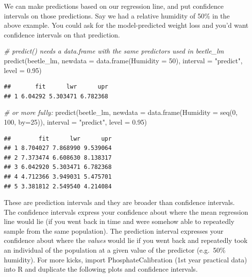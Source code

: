 \documentclass[
  11pt,
  a4paper,
]{book}
\newenvironment{Shaded}{\begin{snugshade}}{\end{snugshade}}
\newcommand{\AttributeTok}[1]{\textcolor[rgb]{0.77,0.63,0.00}{#1}}
\newcommand{\CommentTok}[1]{\textcolor[rgb]{0.56,0.35,0.01}{\textit{#1}}}
\newcommand{\DecValTok}[1]{\textcolor[rgb]{0.00,0.00,0.81}{#1}}
\newcommand{\FloatTok}[1]{\textcolor[rgb]{0.00,0.00,0.81}{#1}}
\newcommand{\FunctionTok}[1]{\textcolor[rgb]{0.00,0.00,0.00}{#1}}
\newcommand{\NormalTok}[1]{#1}
\newcommand{\StringTok}[1]{\textcolor[rgb]{0.31,0.60,0.02}{#1}}
\begin{document}
We can make predictions based on our regression line, and put confidence intervals on those predictions. Say we had a relative humidity of 50\% in the above example. You could ask for the model-predicted weight loss and you'd want confidence intervals on that prediction.

\begin{Shaded}
\begin{Highlighting}[]
\CommentTok{\# predict() needs a data.frame with the same predictors used in beetle\_lm}
\FunctionTok{predict}\NormalTok{(beetle\_lm, }
        \AttributeTok{newdata =} \FunctionTok{data.frame}\NormalTok{(}\AttributeTok{Humidity =} \DecValTok{50}\NormalTok{), }
        \AttributeTok{interval =} \StringTok{"predict"}\NormalTok{, }
        \AttributeTok{level =} \FloatTok{0.95}\NormalTok{)}
\end{Highlighting}
\end{Shaded}

\begin{verbatim}
##       fit      lwr      upr
## 1 6.04292 5.303471 6.782368
\end{verbatim}

\begin{Shaded}
\begin{Highlighting}[]
\CommentTok{\# or more fully:}
\FunctionTok{predict}\NormalTok{(beetle\_lm, }
        \AttributeTok{newdata =} \FunctionTok{data.frame}\NormalTok{(}\AttributeTok{Humidity =} \FunctionTok{seq}\NormalTok{(}\DecValTok{0}\NormalTok{, }\DecValTok{100}\NormalTok{, }\AttributeTok{by=}\DecValTok{25}\NormalTok{)), }
        \AttributeTok{interval =} \StringTok{"predict"}\NormalTok{, }
        \AttributeTok{level =} \FloatTok{0.95}\NormalTok{)}
\end{Highlighting}
\end{Shaded}

\begin{verbatim}
##        fit      lwr      upr
## 1 8.704027 7.868990 9.539064
## 2 7.373474 6.608630 8.138317
## 3 6.042920 5.303471 6.782368
## 4 4.712366 3.949031 5.475701
## 5 3.381812 2.549540 4.214084
\end{verbatim}

These are prediction intervals and they are broader than confidence intervals. The confidence intervals express your confidence about where the mean regression line would lie (if you went back in time and were somehow able to repeatedly sample from the same population). The prediction interval expresses your confidence about where the \emph{values} would lie if you went back and repeatedly took an individual of the population at a given value of the predictor (e.g.~50\% humidity).
For more kicks, import PhosphateCalibration (1st year practical data) into R and duplicate the following plots and confidence intervals.
\end{document}
